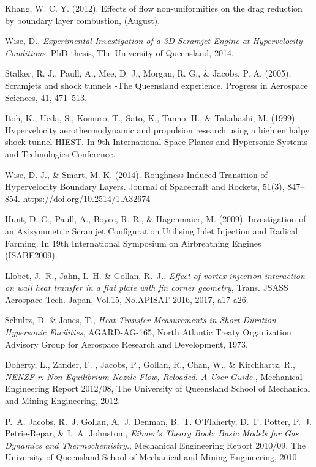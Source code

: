 \documentclass{AIAA}
\begin{document}
\begin{thebibliography}{}
Khang, W. C. Y. (2012). Effects of flow non-uniformities on the drag reduction by boundary layer combustion, (August).

Wise, D., {\it Experimental Investigation of a 3D Scramjet Engine at Hypervelocity Conditions}, PhD thesis, The University of Queensland, 2014.

Stalker, R. J., Paull, A., Mee, D. J., Morgan, R. G., \& Jacobs, P. A. (2005). Scramjets and shock tunnels -The Queensland experience. Progress in Aerospace Sciences, 41, 471–513.

Itoh, K., Ueda, S., Komuro, T., Sato, K., Tanno, H., \& Takahashi, M. (1999). Hypervelocity aerothermodynamic and propulsion research using a high enthalpy shock tunnel HIEST. In 9th International Space Planes and Hypersonic Systems and Technologies Conference.

Wise, D. J., \& Smart, M. K. (2014). Roughness-Induced Transition of Hypervelocity Boundary Layers. Journal of Spacecraft and Rockets, 51(3), 847–854. https://doi.org/10.2514/1.A32674

Hunt, D. C., Paull, A., Boyce, R. R., \& Hagenmaier, M. (2009). Investigation of an Axisymmetric Scramjet Configuration Utilising Inlet Injection and Radical Farming. In 19th International Symposium on Airbreathing Engines (ISABE2009).

Llobet, J.~R., Jahn, I.~H. \& Gollan, R.~J., {\it Effect of vortex-injection interaction on wall heat transfer in a flat plate with fin corner geometry}, Trans. JSASS Aerospace Tech. Japan, Vol.15, No.APISAT-2016, 2017, a17-a26. 

Schultz, D. \& Jones, T., {\it Heat-Transfer Measurements in Short-Duration Hypersonic Facilities}, AGARD-AG-165, North Atlantic Treaty Organization Advisory Group for Aerospace Research and Development, 1973.

Doherty, L., Zander, F. , Jacobs, P., Gollan, R., Chan, W., \& Kirchhartz, R., {\it NENZF-r: Non-Equilibrium Nozzle Flow, Reloaded. A User Guide.}, Mechanical Engineering Report 2012/08, The University of Queensland School of Mechanical and Mining Engineering, 2012.

P.~A. Jacobs, R.~J. Gollan, A.~J. Denman, B.~T. O'Flaherty, D.~F. Potter, P.~J. Petrie-Repar, \& I.~A. Johnston., {\it Eilmer's Theory Book: Basic Models for Gas Dynamics and Thermochemistry.}, Mechanical Engineering Report 2010/09, The University of Queensland School of Mechanical and Mining Engineering, 2010.


\end{thebibliography}
\end{document}

